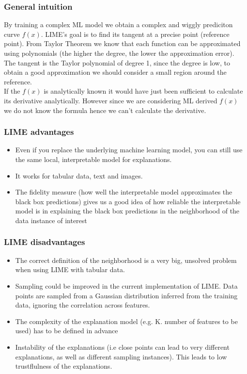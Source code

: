 \subsubsection{General intuition}
By training a complex ML model we obtain a complex and wiggly prediciton curve $f(x)$. LIME's goal is to find its tangent at a precise point (reference point).
From Taylor Theorem we know that each function can be approximated using polynomials (the higher the degree, the lower the approximation error).
The tangent is the Taylor polynomial of degree 1, since the degree is low, to obtain a good approximation we should consider a small region around the reference.\\

If the $f(x)$ is analytically known it would have just been sufficient to calculate its derivative analytically. However since we are considering ML derived $f(x)$ we do not know the formula hence we can't calculate the derivative.

\subsubsection{LIME advantages}
\begin{itemize}
    \item Even if you replace the underlying machine learning model, you can still use the same local, interpretable model for explanations.
    \item It works for tabular data, text and images.
    \item The fidelity measure (how well the interpretable model approximates the black box predictions) gives us a good idea of how reliable
    the interpretable model is in explaining the black box predictions in the neighborhood of the data instance of interest
\end{itemize}

\subsubsection{LIME disadvantages}
\begin{itemize}
    \item The correct definition of the neighborhood is a very big, unsolved problem when using LIME with tabular data.
    \item Sampling could be improved in the current implementation of LIME. Data points are sampled from a Gaussian distribution inferred from the training data, ignoring the correlation across features.
    \item The complexity of the explanation model (e.g. K. number of features to be used) has to be defined in advance
    \item Instability of the explanations (i.e close points can lead to very different explanations, as well as different sampling instances). This leads to low trustflulness of the explanations.
\end{itemize}

